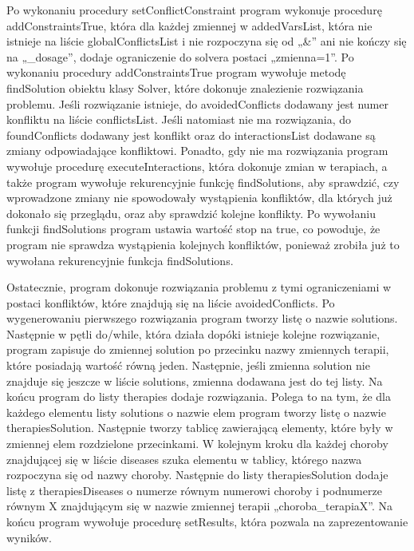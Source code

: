 Po wykonaniu procedury setConflictConstraint program wykonuje procedurę addConstraintsTrue, która dla każdej zmiennej w addedVarsList, która nie istnieje na liście globalConflictsList i nie rozpoczyna się od „\&” ani nie kończy się na „\_dosage”, dodaje ograniczenie do solvera postaci „zmienna=1”. Po wykonaniu procedury addConstraintsTrue program wywołuje metodę findSolution obiektu klasy Solver, które dokonuje znalezienie rozwiązania problemu. Jeśli rozwiązanie istnieje, do avoidedConflicts dodawany jest numer konfliktu na liście conflictsList. Jeśli natomiast nie ma rozwiązania, do foundConflicts dodawany jest konflikt oraz do interactionsList dodawane są zmiany odpowiadające konfliktowi. Ponadto, gdy nie ma rozwiązania program wywołuje procedurę executeInteractions, która dokonuje zmian w terapiach, a także program wywołuje rekurencyjnie funkcję findSolutions, aby sprawdzić, czy wprowadzone zmiany nie spowodowały wystąpienia konfliktów, dla których już dokonało się przeglądu, oraz aby sprawdzić kolejne konflikty. Po wywołaniu funkcji findSolutions program ustawia wartość stop na true, co powoduje, że program nie sprawdza wystąpienia kolejnych konfliktów, ponieważ zrobiła już to wywołana rekurencyjnie funkcja findSolutions. 

Ostatecznie, program dokonuje rozwiązania problemu z tymi ograniczeniami w postaci konfliktów, które znajdują się na liście avoidedConflicts. Po wygenerowaniu pierwszego rozwiązania program tworzy listę o nazwie solutions. Następnie w pętli do/while, która działa dopóki istnieje kolejne rozwiązanie, program zapisuje do zmiennej solution po przecinku nazwy zmiennych terapii, które posiadają wartość równą jeden. Następnie, jeśli zmienna solution nie znajduje się jeszcze w liście solutions, zmienna dodawana jest do tej listy. Na końcu program do listy therapies dodaje rozwiązania. Polega to na tym, że dla każdego elementu listy solutions o nazwie elem program tworzy listę o nazwie therapiesSolution. Następnie tworzy tablicę zawierającą elementy, które były w zmiennej elem rozdzielone przecinkami. W kolejnym kroku dla każdej choroby znajdującej się w liście diseases szuka elementu w tablicy, którego nazwa rozpoczyna się od nazwy choroby. Następnie do listy therapiesSolution dodaje listę z therapiesDiseases o numerze równym numerowi choroby i podnumerze równym X znajdującym się w nazwie zmiennej terapii „choroba\_terapiaX”. Na końcu program wywołuje procedurę setResults, która pozwala na zaprezentowanie wyników. 

